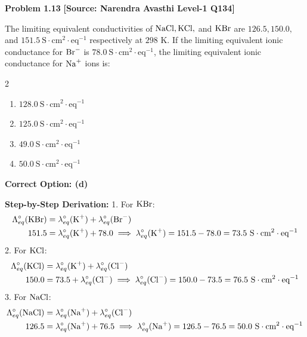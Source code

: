 \begin{problembox}
\textbf{Problem 1.13} \hfill \textbf{[Source: Narendra Avasthi Level-1 Q134]}

The limiting equivalent conductivities of $\ce{NaCl}, \ce{KCl},$ and $\ce{KBr}$ are $126.5, 150.0,$ and $151.5\ \text{S}\cdot\text{cm}^2\cdot\text{eq}^{-1}$ respectively at $298\text{ K}$. If the limiting equivalent ionic conductance for $\ce{Br-}$ is $78.0\ \text{S}\cdot\text{cm}^2\cdot\text{eq}^{-1}$, the limiting equivalent ionic conductance for $\ce{Na+}$ ions is:
\begin{multicols}{2}
\begin{enumerate}[label=(\alph*)]
    \item $128.0\ \text{S}\cdot\text{cm}^2\cdot\text{eq}^{-1}$
    \item $125.0\ \text{S}\cdot\text{cm}^2\cdot\text{eq}^{-1}$
    \item $49.0\ \text{S}\cdot\text{cm}^2\cdot\text{eq}^{-1}$
    \item $50.0\ \text{S}\cdot\text{cm}^2\cdot\text{eq}^{-1}$
\end{enumerate}
\end{multicols}
\end{problembox}
\begin{solution}
\textbf{Correct Option: (d)}

\textbf{Step-by-Step Derivation:}
1. For $\ce{KBr}$:
\begin{align*}
    \Lambda_{eq}^\circ(\ce{KBr}) &= \lambda_{eq}^\circ(\ce{K+}) + \lambda_{eq}^\circ(\ce{Br-}) \\
    151.5 &= \lambda_{eq}^\circ(\ce{K+}) + 78.0 \implies \lambda_{eq}^\circ(\ce{K+}) = 151.5 - 78.0 = 73.5\ \text{S}\cdot\text{cm}^2\cdot\text{eq}^{-1}
\end{align*}
2. For $\ce{KCl}$:
\begin{align*}
    \Lambda_{eq}^\circ(\ce{KCl}) &= \lambda_{eq}^\circ(\ce{K+}) + \lambda_{eq}^\circ(\ce{Cl-}) \\
    150.0 &= 73.5 + \lambda_{eq}^\circ(\ce{Cl-}) \implies \lambda_{eq}^\circ(\ce{Cl-}) = 150.0 - 73.5 = 76.5\ \text{S}\cdot\text{cm}^2\cdot\text{eq}^{-1}
\end{align*}
3. For $\ce{NaCl}$:
\begin{align*}
    \Lambda_{eq}^\circ(\ce{NaCl}) &= \lambda_{eq}^\circ(\ce{Na+}) + \lambda_{eq}^\circ(\ce{Cl-}) \\
    126.5 &= \lambda_{eq}^\circ(\ce{Na+}) + 76.5 \implies \lambda_{eq}^\circ(\ce{Na+}) = 126.5 - 76.5 = 50.0\ \text{S}\cdot\text{cm}^2\cdot\text{eq}^{-1}
\end{align*}
\end{solution}


